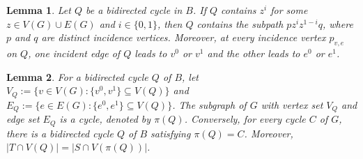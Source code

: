 \documentclass[10pt,a4paper]{amsart}
\newtheorem{lemma}{Lemma}
\begin{document}
\begin{lemma}\label{lem:block-traversal}
Let $Q$ be a bidirected cycle in $B$.  If $Q$ contains $z^i$ for some
$z\in V(G)\cup E(G)$ and $i\in\{0,1\}$, then $Q$ contains the subpath
$pz^iz^{1-i}q$, where $p$ and $q$ are distinct incidence vertices.  Moreover,
at every
incidence vertex $p_{v,e}$ on $Q$, one incident edge of $Q$ leads to
$v^0$ or $v^1$ and the other leads to $e^0$ or $e^1$.
\end{lemma}

\begin{lemma}\label{lem:cycle-correspondence}
For a bidirected cycle $Q$ of $B$, let
$V_Q:=\{v\in V(G):\{v^0,v^1\}\subseteq V(Q)\}$ and
$E_Q:=\{e\in E(G):\{e^0,e^1\}\subseteq V(Q)\}$.  The subgraph of $G$ with
vertex set $V_Q$ and edge set $E_Q$ is a cycle, denoted by $\pi(Q)$.
Conversely, for every cycle $C$ of $G$, there is a bidirected cycle $Q$ of
$B$ satisfying $\pi(Q)=C$.  Moreover,
$|T\cap V(Q)|=|S\cap V(\pi(Q))|$.
\end{lemma}
\end{document}
